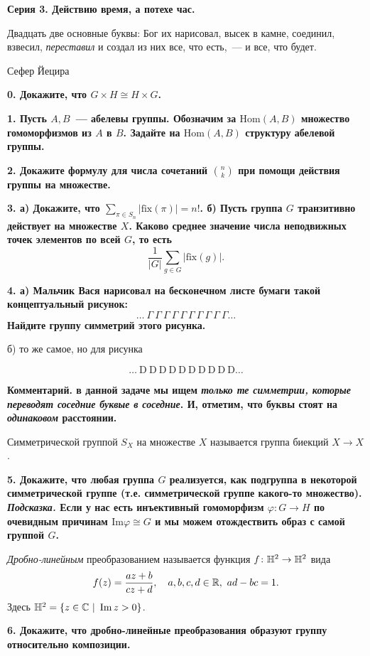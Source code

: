 \documentclass[12pt]{article}
\begin{document}
	\centerline{\bf{Серия 3. Действию время, а потехе час. }}

	\epigraph{Двадцать две основные буквы: Бог их нарисовал, высек в камне, соединил, взвесил, \emph{переставил} и создал из них все, что есть,~--- и все, что будет.}{Сефер Йецира}

	\bf{0.} Докажите, что $G \times H \cong H \times G$.

	\bf{1.} Пусть $A, B$~--- абелевы группы. Обозначим за $\mathrm{Hom}(A, B)$ множество гомоморфизмов из $A$ в $B$. Задайте на $\mathrm{Hom}(A, B)$ структуру абелевой группы. 

	\bf{2.} Докажите формулу для числа сочетаний $\binom{n}{k}$ при помощи действия группы на множестве. 

	\bf{3.} а) Докажите, что $\sum_{\pi \in S_n} |\mathrm{fix}(\pi)| = n!$. б) Пусть группа $G$ транзитивно действует на множестве $X$. Каково среднее значение числа неподвижных точек элементов по всей $G$, то есть 
	\[
		\frac{1}{|G|}\sum_{g \in G} |\mathrm{fix}(g)|. 
	\]


	\bf{4.} а) Мальчик Вася нарисовал на бесконечном листе бумаги такой концептуальный рисунок: 
	\[
		\ldots \ \Gamma \ \Gamma \ \Gamma \ \Gamma \ \Gamma \ \Gamma \ \Gamma \ \Gamma \ \Gamma \ \Gamma \ldots
	\]
	Найдите группу симметрий этого рисунка. 

	б) то же самое, но для рисунка 

	\[
		\ldots \ \mathrm{D} \ \mathrm{D} \ \mathrm{D} \ \mathrm{D} \ \mathrm{D}\ \mathrm{D} \ \mathrm{D} \ \mathrm{D} \ \mathrm{D} \ \mathrm{D}\ldots
	\]

	\noindent\bf{Комментарий.} в данной задаче мы ищем \emph{только те симметрии, которые переводят соседние буквые в соседние}. И, отметим, что буквы стоят на \emph{одинаковом} расстоянии. 

	\begin{definition} 
		Симметрической группой $S_{X}$ на множестве $X$ называется группа биекций $X \to X$.
	\end{definition}

	\bf{5.} Докажите, что любая группа $G$ реализуется, как подгруппа в некоторой симметрической группе (т.е. симметрической группе какого-то множество). \emph{Подсказка.} Если у нас есть инъективный гомоморфизм $\varphi\colon G \to H$ по очевидным причинам $\mathrm{Im}{\varphi} \cong G$ и мы можем отождествить образ с самой группой $G$. 

	\begin{definition} 
		\emph{Дробно-линейным} преобразованием называется функция $f\colon \mathbb{H}^2 \to \mathbb{H}^2$ вида 
		\[
			f(z) = \frac{az + b}{cz + d}, \quad a, b, c, d \in \mathbb{R},\  ad - bc = 1.
		\]
		Здесь $\mathbb{H}^2 = \{ z \in \mathbb{C} \ \vert \ \mathop{\mathrm{Im}}\nolimits{z} > 0 \}$. 
	\end{definition}


	\bf{6.} Докажите, что дробно-линейные преобразования образуют группу относительно композиции.

	
\end{document}
